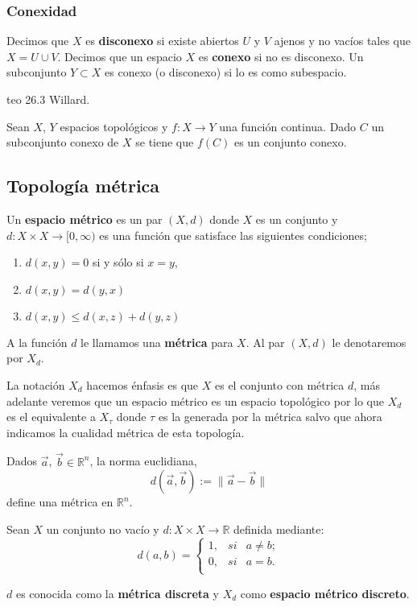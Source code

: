 \subsubsection*{Conexidad}
 Decimos que $X$ es \textbf{disconexo} si existe abiertos $U$ y $V$ ajenos y no vacíos tales que $X = U \cup V$. Decimos que un espacio $X$ es \textbf{conexo} si no es disconexo. Un subconjunto $Y \subset X$ es conexo (o disconexo) si lo es como subespacio.
	

teo 26.3 Willard.

\begin{te}
Sean $X$, $Y$ espacios topológicos y $f:X \to Y$ una función continua. Dado $C$ un subconjunto conexo de $X$ se tiene que $f(C)$ es un conjunto conexo.
\end{te}


\subsection*{Topología métrica}
Un \textbf{espacio métrico} es un par $(X, d)$ donde $X$ es un conjunto y $d:X \times X \to [0, \infty)$ es una función que satisface las siguientes condiciones;

\begin{enumerate}
\item $d(x,y)=0$ si y sólo si $x=y$,
\item $d(x,y)=d(y,x)$
\item $d(x,y) \leq d(x,z)+d(y,z)$
\end{enumerate}


A la función $d$ le llamamos una \textbf{métrica} para $X$. Al par $(X,d)$ le denotaremos por $X_d$. 

\begin{ob}
La notación $X_d$ hacemos énfasis es que $X$ es el conjunto con métrica $d$, más adelante veremos que un espacio métrico es un espacio topológico por lo que $X_d$ es el equivalente a $X_\tau$ donde $\tau$ es la generada por la métrica salvo que ahora indicamos la cualidad métrica de esta topología.  
\end{ob}

\begin{ej}
 Dados $\vec{a}$, $\vec{b} \in \mathbb{R}^{n}$, la norma euclidiana,
$$d(\vec{a},\vec{b}):=\parallel \vec{a}-\vec{b} \parallel$$
define una métrica en $\mathbb{R}^{n}$.
\end{ej}

\begin{ej}
 Sean $X$ un conjunto no vacío y $d : X \times X \to\mathbb{R}$ definida mediante:
$$d(a,b)=\left\{
\begin{array}{lcc}
1, & si & a \neq b; \\
0, & si & a=b. \\
\end{array}
\right.$$

$d$ es conocida como la \textbf{métrica discreta} y  $X_{d}$ como \textbf{espacio métrico discreto}.
\end{ej}

